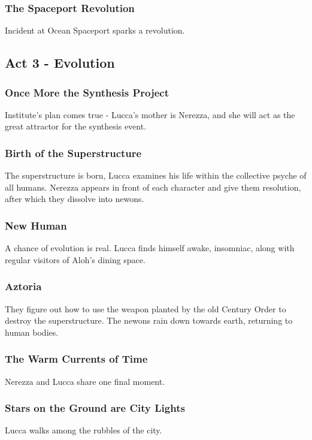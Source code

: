\documentclass[11pt]{article}
\begin{document}
		\subsubsection{The Spaceport Revolution}
		Incident at Ocean Spaceport sparks a revolution.
	\newpage




	\subsection{Act 3 - Evolution}
		\subsubsection{Once More the Synthesis Project}
		Institute's plan comes true - Lucca's mother is Nerezza, and she will act as the great attractor for the synthesis event.
		\subsubsection{Birth of the Superstructure}
		The superstructure is born, Lucca examines his life within the collective psyche of all humans. 
		Nerezza appears in front of each character and give them resolution, after which they dissolve into newons.
		\subsubsection{New Human}
		A chance of evolution is real. 
		Lucca finds himself awake, insomniac, along with regular visitors of Aloh's dining space.
		\subsubsection{Aztoria}
		They figure out how to use the weapon planted by the old Century Order to destroy the superstructure.
		The newons rain down towards earth, returning to human bodies.
		\subsubsection{The Warm Currents of Time}
		Nerezza and Lucca share one final moment.
		\subsubsection{Stars on the Ground are City Lights}
		Lucca walks among the rubbles of the city.
\newpage
\end{document}
